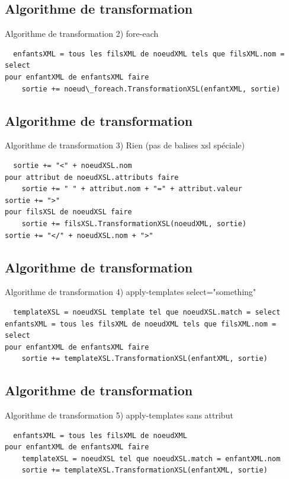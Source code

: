 \documentclass[aspectratio=169]{beamer}
\begin{document}
\subsection{Algorithme de transformation}
\begin{frame}[fragile]{Algorithme de transformation}
 2) fore-each
 \scriptsize
 \begin{verbatim}
  enfantsXML = tous les filsXML de noeudXML tels que filsXML.nom = select
pour enfantXML de enfantsXML faire
    sortie += noeud\_foreach.TransformationXSL(enfantXML, sortie)
 \end{verbatim}
\normalsize
\end{frame}

\subsection{Algorithme de transformation}
\begin{frame}[fragile]{Algorithme de transformation}
 3) Rien (pas de balises xsl spéciale)
 \scriptsize
 \begin{verbatim}
  sortie += "<" + noeudXSL.nom
pour attribut de noeudXSL.attributs faire
    sortie += " " + attribut.nom + "=" + attribut.valeur
sortie += ">"
pour filsXSL de noeudXSL faire
    sortie += filsXSL.TransformationXSL(noeudXML, sortie)    
sortie += "</" + noeudXSL.nom + ">"
 \end{verbatim}
\normalsize
\end{frame}

\subsection{Algorithme de transformation}
\begin{frame}[fragile]{Algorithme de transformation}
 4) apply-templates select="something"
 \scriptsize
 \begin{verbatim}
  templateXSL = noeudXSL template tel que noeudXSL.match = select
enfantsXML = tous les filsXML de noeudXML tels que filsXML.nom = select
pour enfantXML de enfantsXML faire
    sortie += templateXSL.TransformationXSL(enfantXML, sortie)
 \end{verbatim}
\normalsize
\end{frame}

\subsection{Algorithme de transformation}
\begin{frame}[fragile]{Algorithme de transformation}
 5) apply-templates sans attribut
 \scriptsize
 \begin{verbatim}
  enfantsXML = tous les filsXML de noeudXML
pour enfantXML de enfantsXML faire
    templateXSL = noeudXSL tel que noeudXSL.match = enfantXML.nom
    sortie += templateXSL.TransformationXSL(enfantXML, sortie)
 \end{verbatim}
\normalsize
\end{frame}
\end{document}
